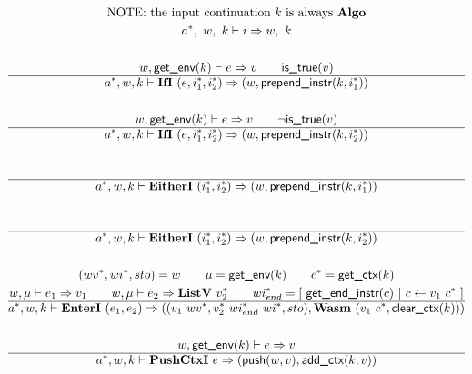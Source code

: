 \begin{gather*}
  \text{NOTE: the input continuation $k$ is always \algo} \\
  \seq{a}, ~ w, ~ k \vdash i \Rightarrow w, ~ k \\
%
\newline \\
  w, \getenv(k) \vdash e \Rightarrow v \qquad
  \istrue(v) \\
  \hline
  \seq{a}, w, k \vdash \ifi ~ (e, \seq{i_1}, \seq{i_2}) \Rightarrow (w, \prependinstr(k, \seq{i_1})) \\
%
\newline \\
  w, \getenv(k) \vdash e \Rightarrow v \qquad
  \neg \istrue(v) \\
  \hline
  \seq{a}, w, k \vdash \ifi ~ (e, \seq{i_1}, \seq{i_2}) \Rightarrow (w, \prependinstr(k, \seq{i_2})) \\
%
\newline \\
  \\
  \hline
  \seq{a}, w, k \vdash \eitheri ~ (\seq{i_1}, \seq{i_2}) \Rightarrow (w, \prependinstr(k, \seq{i_1})) \\
%
\newline \\
  \\
  \hline
  \seq{a}, w, k \vdash \eitheri ~ (\seq{i_1}, \seq{i_2}) \Rightarrow (w, \prependinstr(k, \seq{i_2})) \\
%
\newline \\
  (\seq{wv}, \seq{wi}, sto) = w \qquad
  \mu = \getenv(k) \qquad
  \seq c = \getctx(k) \\
  w, \mu \vdash e_1 \Rightarrow v_1 \qquad
  w, \mu \vdash e_2 \Rightarrow \listv ~ \seq{v_2} \qquad
  \seq{wi_{end}} = [ ~ \getendinstr(c) ~ | ~ c \leftarrow v_1 ~ \seq c ~ ] \\
  \hline
  \seq{a}, w, k \vdash \enteri ~ (e_1, e_2)
  \Rightarrow
  ((v_1 ~ \seq{wv}, \seq{v_2} ~ \seq{wi_{end}}~ \seq{wi}, sto), \wasm ~ (v_1 ~ \seq c, \clearctx(k))) \\
%
\newline \\
  w, \getenv(k) \vdash e \Rightarrow v \\
  \hline
  \seq{a}, w, k \vdash \pushctxi ~ e
  \Rightarrow
  (\push(w, v), \addctx(k, v)) \\
%
\newline \\

\end{gather*}
